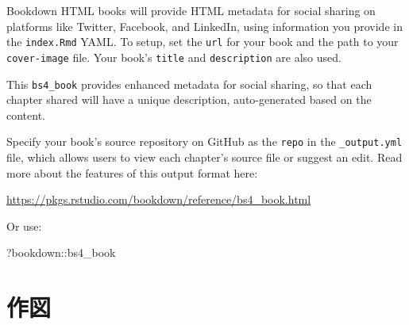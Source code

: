 \documentclass[
]{book}
\newenvironment{Shaded}{\begin{snugshade}}{\end{snugshade}}
\newcommand{\NormalTok}[1]{#1}
\newcommand{\SpecialCharTok}[1]{\textcolor[rgb]{0.00,0.00,0.00}{#1}}
\theoremstyle{definition}
\theoremstyle{definition}
\theoremstyle{definition}
\theoremstyle{definition}
\theoremstyle{remark}
\begin{document}
Bookdown HTML books will provide HTML metadata for social sharing on platforms like Twitter, Facebook, and LinkedIn, using information you provide in the \texttt{index.Rmd} YAML. To setup, set the \texttt{url} for your book and the path to your \texttt{cover-image} file. Your book's \texttt{title} and \texttt{description} are also used.

This \texttt{bs4\_book} provides enhanced metadata for social sharing, so that each chapter shared will have a unique description, auto-generated based on the content.

Specify your book's source repository on GitHub as the \texttt{repo} in the \texttt{\_output.yml} file, which allows users to view each chapter's source file or suggest an edit. Read more about the features of this output format here:

\url{https://pkgs.rstudio.com/bookdown/reference/bs4_book.html}

Or use:

\begin{Shaded}
\begin{Highlighting}[]
\NormalTok{?bookdown}\SpecialCharTok{::}\NormalTok{bs4\_book}
\end{Highlighting}
\end{Shaded}

\hypertarget{maps}{%
\chapter{作図}\label{maps}}
\end{document}
